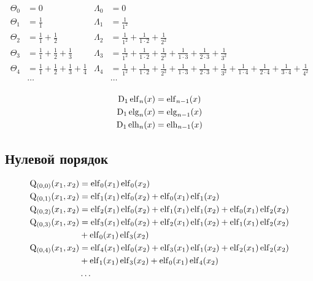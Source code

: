 \begin{equation*} \begin{aligned}
\Theta_0 &= 0 &
\Lambda_0 &= 0 \\
%
\Theta_1 &= 
  \frac{1}{1} &
\Lambda_1 &= 
  \frac{1}{1^2} \\
%
\Theta_2 &= 
  \frac{1}{1} 
+ \frac{1}{2} &
\Lambda_2 &= 
  \frac{1}{1^2} 
+ \frac{1}{1 \cdot 2} 
+ \frac{1}{2^2} \\
%
\Theta_3 &= 
  \frac{1}{1} 
+ \frac{1}{2} 
+ \frac{1}{3} &
\Lambda_3 &= 
  \frac{1}{1^2} 
+ \frac{1}{1 \cdot 2} 
+ \frac{1}{2^2}
+ \frac{1}{1 \cdot 3}
+ \frac{1}{2 \cdot 3}
+ \frac{1}{3^2} \\
%
\Theta_4 &= 
  \frac{1}{1} 
+ \frac{1}{2} 
+ \frac{1}{3} 
+ \frac{1}{4} &
\Lambda_4 &= 
  \frac{1}{1^2} 
+ \frac{1}{1 \cdot 2} 
+ \frac{1}{2^2}
+ \frac{1}{1 \cdot 3}
+ \frac{1}{2 \cdot 3}
+ \frac{1}{3^2}
+ \frac{1}{1 \cdot 4}
+ \frac{1}{2 \cdot 4}
+ \frac{1}{3 \cdot 4}
+ \frac{1}{4^2} \\
%
&\ldots & &\ldots \\
\end{aligned} \end{equation*}

\begin{equation*} \begin{aligned}
\mathrm{D}_1 \operatorname{elf}_n(x) &= \operatorname{elf}_{n - 1}(x) \\
\mathrm{D}_1 \operatorname{elg}_n(x) &= \operatorname{elg}_{n - 1}(x) \\
\mathrm{D}_1 \operatorname{elh}_n(x) &= \operatorname{elh}_{n - 1}(x) \\
\end{aligned} \end{equation*}

\subsection{Нулевой порядок}

\begin{equation*} \begin{aligned}
\mathrm{Q}_{(0,0)}(x_1, x_2) &=  
  \elf_0(x_1) \elf_0(x_2) \\
%
\mathrm{Q}_{(0,1)}(x_1, x_2) &=  
  \elf_1(x_1) \elf_0(x_2)
+ \elf_0(x_1) \elf_1(x_2) \\
%
\mathrm{Q}_{(0,2)}(x_1, x_2) &=  
  \elf_2(x_1) \elf_0(x_2)
+ \elf_1(x_1) \elf_1(x_2)
+ \elf_0(x_1) \elf_2(x_2) \\
%
\mathrm{Q}_{(0,3)}(x_1, x_2) &=  
  \elf_3(x_1) \elf_0(x_2)
+ \elf_2(x_1) \elf_1(x_2)
+ \elf_1(x_1) \elf_2(x_2) \\ &
+ \elf_0(x_1) \elf_3(x_2) \\
%
\mathrm{Q}_{(0,4)}(x_1, x_2) &=  
  \elf_4(x_1) \elf_0(x_2)
+ \elf_3(x_1) \elf_1(x_2)
+ \elf_2(x_1) \elf_2(x_2) \\ &
+ \elf_1(x_1) \elf_3(x_2)
+ \elf_0(x_1) \elf_4(x_2) \\
%
&\ldots \\
\end{aligned} \end{equation*}


